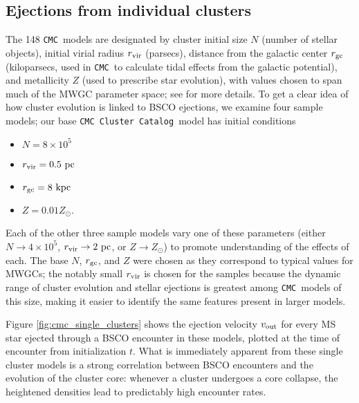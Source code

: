 \documentclass[twocolumn,linenumbers]{aastex631}
\newcommand{\CMC}{\texttt{CMC}}
\newcommand{\CMCcat}{\texttt{CMC Cluster Catalog}}
\begin{document}
\subsection{Ejections from individual clusters} \label{subsec:single_clusters}

The 148 \CMC\ models are designated by cluster initial size $N$ (number of stellar objects), initial virial radius $r_{\rm vir}$ (parsecs), distance from the galactic center $r_{\rm gc}$ (kiloparsecs, used in \CMC\ to calculate tidal effects from the galactic potential), and metallicity $Z$ (used to prescribe star evolution), with values chosen to span much of the MWGC parameter space; see \citet{2020IAUS..351..357K} for more details.
To get a clear idea of how cluster evolution is linked to BSCO ejections, we examine four sample models; our base \CMCcat\ model has initial conditions
\begin{itemize}
    \item $N = 8 \times 10^5$
    \item $r_{\rm vir} = 0.5~{\rm pc}$
    \item $r_{\rm gc} = 8~{\rm kpc}$
    \item $Z = 0.01Z_\odot$.
\end{itemize}
Each of the other three sample models vary one of these parameters (either $N \to 4 \times 10^5$, $r_{\rm vir} \to 2~{\rm pc}$, or $Z \to Z_\odot$) to promote understanding of the effects of each.
The base $N$, $r_{\rm gc}$, and $Z$ were chosen as they correspond to typical values for MWGCs; the notably small $r_{\rm vir}$ is chosen for the samples because the dynamic range of cluster evolution and stellar ejections is greatest among \CMC\ models of this size, making it easier to identify the same features present in larger models.

Figure \ref{fig:cmc_single_clusters} shows the ejection velocity $v_{\rm out}$ for every MS star ejected through a BSCO encounter in these models, plotted at the time of encounter from initialization $t$.
What is immediately apparent from these single cluster models is a strong correlation between BSCO encounters and the evolution of the cluster core: whenever a cluster undergoes a core collapse, the heightened densities lead to predictably high encounter rates.
\end{document}
